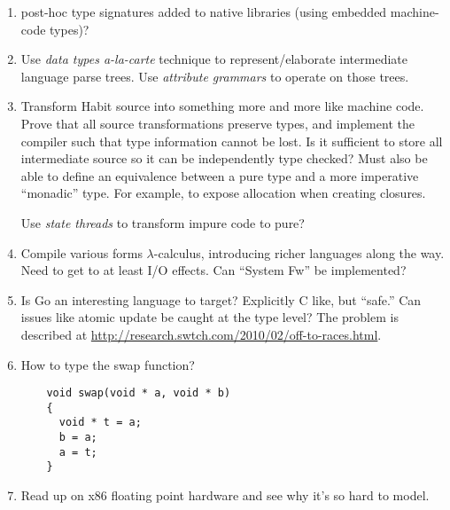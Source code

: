 \documentclass[11pt]{article}
\begin{document}
\begin{enumerate}
\item post-hoc type signatures added to native libraries (using
  embedded machine-code types)?

\item Use \emph{data types a-la-carte} technique to represent/elaborate
  intermediate language parse trees. Use \emph{attribute grammars} to operate
  on those trees.

\item Transform Habit source into something more and more like machine code. Prove
  that all source transformations preserve types, and implement the compiler such
  that type information cannot be lost. Is it sufficient to store all intermediate
  source so it can be independently type checked? Must also be able to define an
  equivalence between a pure type and a more imperative ``monadic'' type. For example,
  to expose allocation when creating closures.

  Use \emph{state threads} to transform impure code to pure?

\item Compile various forms $\lambda$-calculus, introducing richer languages along the 
  way. Need to get to at least I/O effects. Can ``System Fw'' be implemented?

\item Is Go an interesting language to target? Explicitly C like, but
  ``safe.'' Can issues like atomic update be caught at the type level?
  The problem is described at
  \url{http://research.swtch.com/2010/02/off-to-races.html}.

\item How to type the swap function? 

  \begin{Verbatim}
    void swap(void * a, void * b)
    {
      void * t = a;
      b = a;
      a = t;
    }
  \end{Verbatim}

\item Read up on x86 floating point hardware and see why it's so hard to model.

\end{enumerate} 
\end{document}
